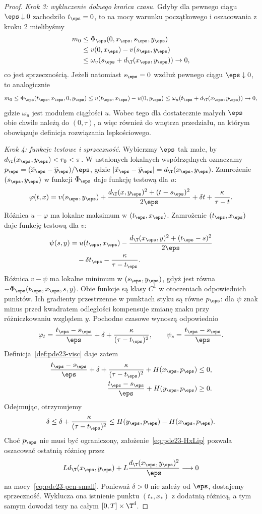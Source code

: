 \begin{proof}
\emph{Krok 3: wykluczenie dolnego krańca czasu.}
Gdyby dla pewnego ciągu $\eps\downarrow0$
zachodziło $t_\eps=0$, to na mocy warunku początkowego
i oszacowania z kroku 2 mielibyśmy
\[
 \begin{split}
 m_0&\le \Phi_\eps(0,x_\eps,s_\eps,y_\eps)\\
 &\le v(0,x_\eps)-v(s_\eps,y_\eps)\\
 &\le \omega_v(s_\eps+d_{\T}(x_\eps,y_\eps))\to0,
 \end{split}
\]
co jest sprzecznością.
Jeżeli natomiast $s_\eps=0$ wzdłuż pewnego
ciągu $\eps\downarrow0$, to analogicznie
\[
 m_0\le \Phi_\eps(t_\eps,x_\eps,0,y_\eps)
 \le u(t_\eps,x_\eps)-u(0,y_\eps)
 \le \omega_u(t_\eps+d_{\T}(x_\eps,y_\eps))\to0,
\]
gdzie $\omega_u$ jest modułem ciągłości $u$.
Wobec tego dla dostatecznie małych $\eps$ obie
chwile należą do $(0,\tau)$, a więc również
do wnętrza przedziału, na którym obowiązuje
definicja rozwiązania lepkościowego.

\emph{Krok 4: funkcje testowe i sprzeczność.}
Wybierzmy $\eps$ tak małe, by
$d_{\T}(x_\eps,y_\eps)<r_0<\pi$.
W ustalonych lokalnych współrzędnych oznaczamy
$p_\eps=(\widetilde x_\eps-\widetilde y_\eps)/\eps$,
gdzie $|\widetilde x_\eps-\widetilde y_\eps|
=d_{\T}(x_\eps,y_\eps)$.
Zamrożenie $(s_\eps,y_\eps)$ w funkcji $\Phi_\eps$
daje funkcję testową dla $u$:
\[
 \varphi(t,x)=v(s_\eps,y_\eps)
 +\frac{d_{\T}(x,y_\eps)^2+(t-s_\eps)^2}{2\eps}
 +\delta t+\frac{\kappa}{\tau-t}.
\]
Różnica $u-\varphi$ ma lokalne maksimum
w $(t_\eps,x_\eps)$.
Zamrożenie $(t_\eps,x_\eps)$ daje funkcję testową
dla $v$:
\[
 \begin{split}
 \psi(s,y)&=u(t_\eps,x_\eps)
 -\frac{d_{\T}(x_\eps,y)^2+(t_\eps-s)^2}{2\eps}\\
 &\quad-\delta t_\eps-\frac{\kappa}{\tau-t_\eps}.
 \end{split}
\]
Różnica $v-\psi$ ma lokalne minimum
w $(s_\eps,y_\eps)$, gdyż jest równa
$-\Phi_\eps(t_\eps,x_\eps,s,y)$.
Obie funkcje są klasy $C^1$ w otoczeniach
odpowiednich punktów. Ich gradienty przestrzenne
w punktach styku są równe $p_\eps$: dla $\psi$
znak minus przed kwadratem odległości kompensuje
zmianę znaku przy różniczkowaniu względem $y$.
Pochodne czasowe wynoszą odpowiednio
\[
 \varphi_t=\frac{t_\eps-s_\eps}{\eps}
             +\delta+\frac{\kappa}{(\tau-t_\eps)^2},
 \qquad
 \psi_s=\frac{t_\eps-s_\eps}{\eps}.
\]
Definicja~\ref{def:pde23-visc} daje zatem
\[
 \begin{split}
 \frac{t_\eps-s_\eps}{\eps}
 +\delta+\frac{\kappa}{(\tau-t_\eps)^2}
 +H(x_\eps,p_\eps)&\le0,\\
 \frac{t_\eps-s_\eps}{\eps}+H(y_\eps,p_\eps)&\ge0.
 \end{split}
\]
Odejmując, otrzymujemy
\[
 \delta\le\delta+\frac{\kappa}{(\tau-t_\eps)^2}
 \le H(y_\eps,p_\eps)-H(x_\eps,p_\eps).
\]
Choć $p_\eps$ nie musi być ograniczony,
założenie~\eqref{eq:pde23-HxLip} pozwala oszacować
ostatnią różnicę przez
\[
 Ld_{\T}(x_\eps,y_\eps)
 +L\frac{d_{\T}(x_\eps,y_\eps)^2}{\eps}\longrightarrow0
\]
na mocy~\eqref{eq:pde23-pen-small}.
Ponieważ $\delta>0$ nie zależy od $\eps$, dostajemy
sprzeczność. Wyklucza ona istnienie punktu
$(t_*,x_*)$ z dodatnią różnicą, a tym samym
dowodzi tezy na całym $[0,T]\times\T^d$.
\end{proof}

